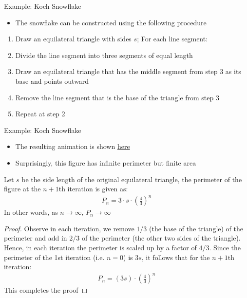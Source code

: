 \documentclass[10pt,xcolor={table,dvipsnames},t]{beamer}
\begin{document}
\begin{frame}{Example: Koch Snowflake}
  \begin{itemize}
    \item The snowflake can be constructed using the following procedure
  \end{itemize}
  \begin{enumerate}
    \item Draw an equilateral triangle with sides $s$; For each line segment:
    \item Divide the line segment into three segments of equal length
    \item Draw an equilateral triangle that has the middle segment from step 3 as its base and points outward
    \item Remove the line segment that is the base of the triangle from step 3
    \item Repeat at step 2
  \end{enumerate}
\end{frame}

\begin{frame}{Example: Koch Snowflake}
  \begin{itemize}
    \item The resulting animation is shown \href{https://www.robinsnyder.com/KochSnowflake}{here}
    \item Surprisingly, this figure has infinite perimeter but finite area
  \end{itemize}
  \begin{theorem}
    Let $s$ be the side length of the original equilateral triangle, the perimeter of the figure at the $n+1$th iteration is given as:
    \begin{align*}
      P_n = 3\cdot s \cdot \left(\frac{4}{3}\right)^n
    \end{align*} 
    In other words, as $n\to \infty$, $P_n \to \infty$
  \end{theorem}
\end{frame}

\begin{frame}
  \begin{proof}
    Observe in each iteration, we remove $1/3$ (the base of the triangle) of the perimeter and add in $2/3$ of the perimeter (the other two sides of the triangle). Hence, in each iteration the perimeter is scaled up by a factor of $4/3$. Since the perimeter of the 1st iteration (i.e. $n=0$) is $3s$, it follows that for the $n+1$th iteration:
    \begin{align*}
      P_n = \left(3s\right) \cdot \left(\frac{4}{3}\right)^{n}
    \end{align*}
    This completes the proof
  \end{proof}
\end{frame}
\end{document}

